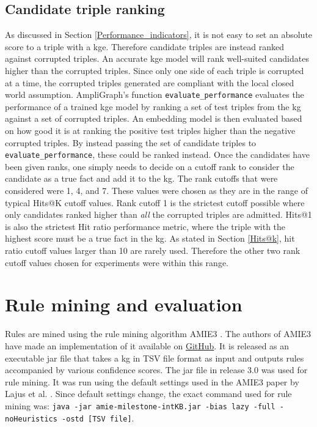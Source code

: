 \subsection{Candidate triple ranking}
As discussed in Section \ref{Performance_indicators}, it is not easy to set an absolute score to a triple with a \gls{kge}. Therefore candidate triples are instead ranked against corrupted triples. An accurate \gls{kge} model will rank well-suited candidates higher than the corrupted triples. Since only one side of each triple is corrupted at a time, the corrupted triples generated are compliant with the local closed world assumption. AmpliGraph's function \texttt{evaluate\_performance} evaluates the performance of a trained \gls{kge} model by ranking a set of test triples from the \gls{kg} against a set of corrupted triples. An embedding model is then evaluated based on how good it is at ranking the positive test triples higher than the negative corrupted triples. By instead passing the set of candidate triples to \texttt{evaluate\_performance}, these could be ranked instead. Once the candidates have been given ranks, one simply needs to decide on a cutoff rank to consider the candidate as a true fact and add it to the \gls{kg}. The rank cutoffs that were considered were 1, 4, and 7. These values were chosen as they are in the range of typical Hits@K cutoff values. Rank cutoff 1 is the strictest cutoff possible where only candidates ranked higher than \textit{all} the corrupted triples are admitted. Hits@1 is also the strictest Hit ratio performance metric, where the triple with the highest score must be a true fact in the \gls{kg}. As stated in Section \ref{Hits@k}, hit ratio cutoff values larger than 10 are rarely used. Therefore the other two rank cutoff values chosen for experiments were within this range.

\section{Rule mining and evaluation}
Rules are mined using the rule mining algorithm AMIE3 \cite{amie3}. The authors of AMIE3 have made an implementation of it available on \hyperlink{https://github.com/lajus/amie}{GitHub}. It is released as an executable jar file that takes a \gls{kg} in TSV file format as input and outputs rules accompanied by various confidence scores. The jar file in release 3.0 was used for rule mining. It was run using the default settings used in the AMIE3 paper by Lajus et al. \cite{amie3}. Since default settings change, the exact command used for rule mining was: \texttt{java -jar amie-milestone-intKB.jar -bias lazy -full -noHeuristics -ostd [TSV file]}.

